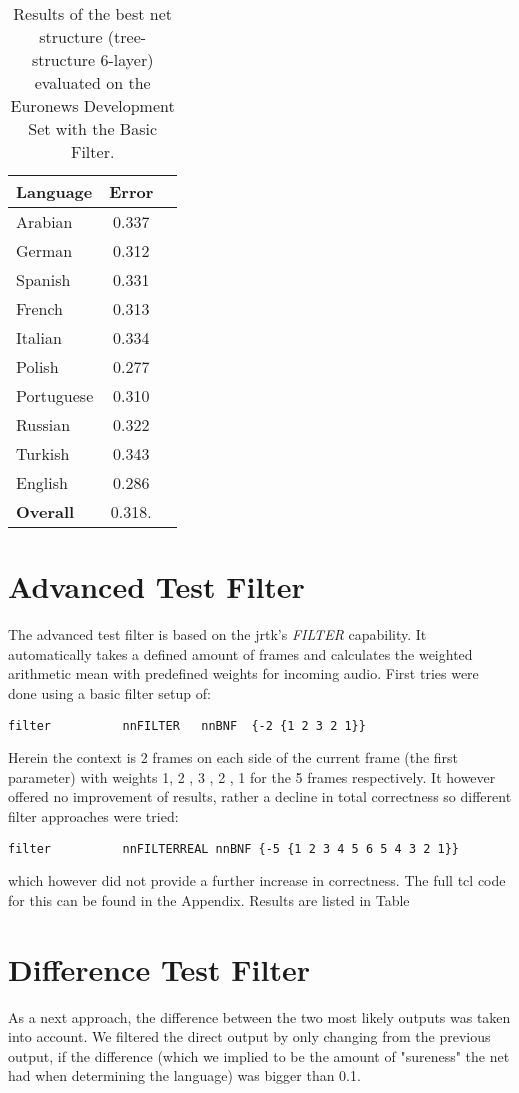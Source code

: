 \begin{table}[h!]
\label{tab:basic}
\centering
\begin{tabular}{| l | c | r | }
	\hline
	\textbf{Language} & \textbf{Error}  \\
	\hline
	Arabian & 0.337  \\
	German & 0.312  \\
	Spanish & 0.331 \\ 
	French & 0.313 \\
	Italian & 0.334  \\
	Polish & 0.277 \\
	Portuguese& 0.310  \\
	Russian&  0.322 \\
	Turkish&  0.343 \\
	English&  0.286 \\
	\hline
	\textbf{Overall} & 0.318. \\
	\hline
\end{tabular}
\caption{Results of the best net structure (tree-structure 6-layer) evaluated on the Euronews Development Set with the Basic Filter.}
\end{table}


\section{Advanced Test Filter}
\label{sec:eval:advanced}
The advanced test filter is based on the jrtk's \textit{FILTER} capability. It automatically takes a defined amount of frames and calculates the weighted arithmetic mean with predefined weights for incoming audio. First tries were done using a basic filter setup of:
\begin{verbatim}
filter          nnFILTER   nnBNF  {-2 {1 2 3 2 1}}
\end{verbatim}  Herein the context is 2 frames on each side of the current frame (the first parameter) with weights 1, 2 , 3 , 2 , 1 for the 5 frames respectively.  It however offered no improvement of results, rather a decline in total correctness so different filter approaches were tried:
\begin{verbatim}
filter          nnFILTERREAL nnBNF {-5 {1 2 3 4 5 6 5 4 3 2 1}}
\end{verbatim}
which however did not provide a further increase in correctness. The full tcl code for this can be found in the Appendix. Results are listed in Table


\section{Difference Test Filter}
\label{sec:eval:variance}
As a next approach, the difference between the two most likely outputs was taken into account. We filtered the direct output by only changing from the previous output, if the difference (which we implied to be the amount of "sureness" the net had when determining the language) was bigger than 0.1. 

